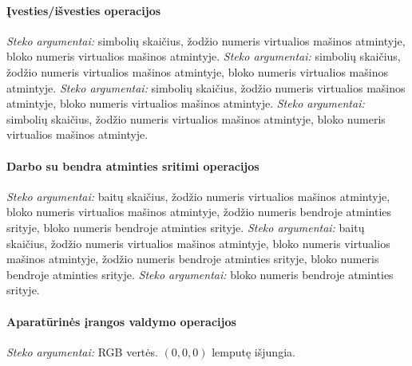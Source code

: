 \documentclass{scrartcl}
\begin{document}
                \paragraph{Įvesties/išvesties operacijos}
                    \emph{Steko argumentai:} simbolių skaičius, žodžio numeris virtualios mašinos atmintyje, bloko numeris virtualios mašinos atmintyje.
                    \emph{Steko argumentai:} simbolių skaičius, žodžio numeris virtualios mašinos atmintyje, bloko numeris virtualios mašinos atmintyje.
                    \emph{Steko argumentai:} simbolių skaičius, žodžio numeris virtualios mašinos atmintyje, bloko numeris virtualios mašinos atmintyje.
                    \emph{Steko argumentai:} simbolių skaičius, žodžio numeris virtualios mašinos atmintyje, bloko numeris virtualios mašinos atmintyje.
                \paragraph{Darbo su bendra atminties sritimi operacijos}
                    \emph{Steko argumentai:} baitų skaičius, žodžio numeris virtualios mašinos atmintyje, bloko numeris virtualios mašinos atmintyje, žodžio numeris bendroje atminties srityje, bloko numeris bendroje atminties srityje.
                    \emph{Steko argumentai:} baitų skaičius, žodžio numeris virtualios mašinos atmintyje, bloko numeris virtualios mašinos atmintyje, žodžio numeris bendroje atminties srityje, bloko numeris bendroje atminties srityje.
                    \emph{Steko argumentai:} bloko numeris bendroje atminties srityje.
                \paragraph{Aparatūrinės įrangos valdymo operacijos}
                    \emph{Steko argumentai:} RGB vertės. $(0, 0, 0)$ lemputę išjungia.
\end{document}
